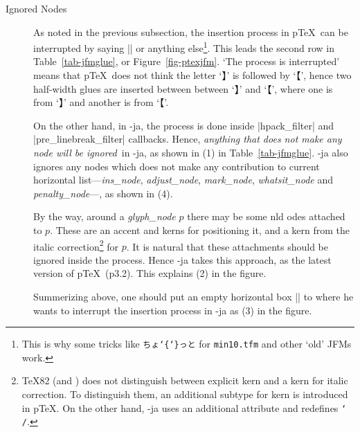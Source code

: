 \documentclass{ajt}
\begin{document}
\begin{description}
\item[Ignored Nodes]
As noted in the previous subsection, the insertion process in p\TeX\ can
	   be interrupted by saying |{}| or anything else\footnote{This
	   is why some tricks like \texttt{ちょ\char`\{\char`\}っと} for
	   \texttt{min10.tfm} and other `old' JFMs work.}. This leads
	   the second row in Table~\ref{tab-jfmglue}, or
	   Figure~\ref{fig-ptexjfm}. `The process is interrupted' means
	   that p\TeX\ does not think the letter `】\inhibitglue' is
	   followed by `\inhibitglue【', hence two half-width glues are
	   inserted between between `】\inhibitglue' and `\inhibitglue【',
	   where one is from `】\inhibitglue' and another is from
	   `\inhibitglue【'.

	   On the other hand, in \LuaTeX-ja, the process is done inside
	   |hpack_filter| and |pre_linebreak_filter| callbacks. Hence,
	   \emph{anything that does not make any node will be
	   ignored}\ in \LuaTeX-ja, as shown in (1) in
	   Table~\ref{tab-jfmglue}. \LuaTeX-ja also ignores any nodes
	   which does not make any contribution to current horizontal
	   list---\emph{ins\_node}, \emph{adjust\_node},
	   \emph{mark\_node}, \emph{whatsit\_node} and
	   \emph{penalty\_node}---, as shown in (4).


By the way, around a \emph{glyph\_node} $p$ there may be some nld odes
	   attached to $p$. These are an accent and kerns for
	   positioning it, and a kern from the italic
	   correction\footnote{\TeX82 (and \LuaTeX) does not distinguish
	   between explicit kern and a kern for italic correction. To
	   distinguish them, an additional subtype for kern is introduced
	   in p\TeX. On the other hand, \LuaTeX-ja uses an additional attribute and
	   redefines \texttt{\char`\\/}.} for $p$. It is natural that
	   these attachments should be ignored inside the process. Hence
	   \LuaTeX-ja takes this approach, as the latest version of
	   p\TeX\ (p3.2). This explains (2) in the figure.

Summerizing above, one should put an empty horizontal box |\hbox{}| to
	   where he wants to interrupt the insertion process in
	   \LuaTeX-ja as (3) in the figure.


\end{description}
\end{document}

